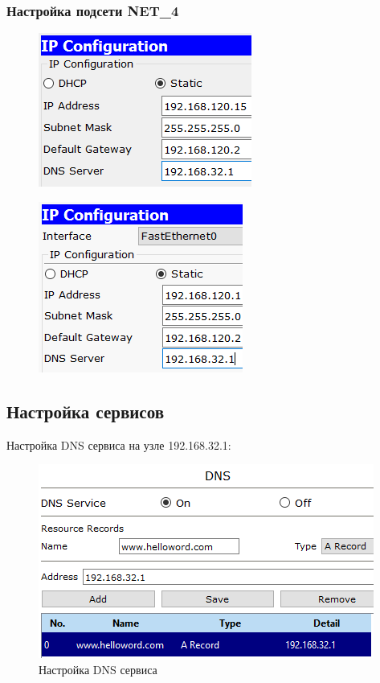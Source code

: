 \documentclass[14pt,a4paper,report]{report}
\begin{document}
\clearpage

\subsubsection{Настройка подсети NET\_4}

\begin{figure}[h!]
	\centering
	\includegraphics[scale = 0.85]{images/6_1.png}
\end{figure}

\begin{figure}[h!]
	\centering
	\includegraphics[scale = 0.85]{images/6_2.png}
\end{figure}

\subsection{Настройка сервисов}

Настройка DNS сервиса на узле 192.168.32.1:

\begin{figure}[h!]
	\centering
	\includegraphics[scale = 1.35]{images/7.png}
	\caption{Настройка DNS сервиса}
\end{figure}
\end{document}
